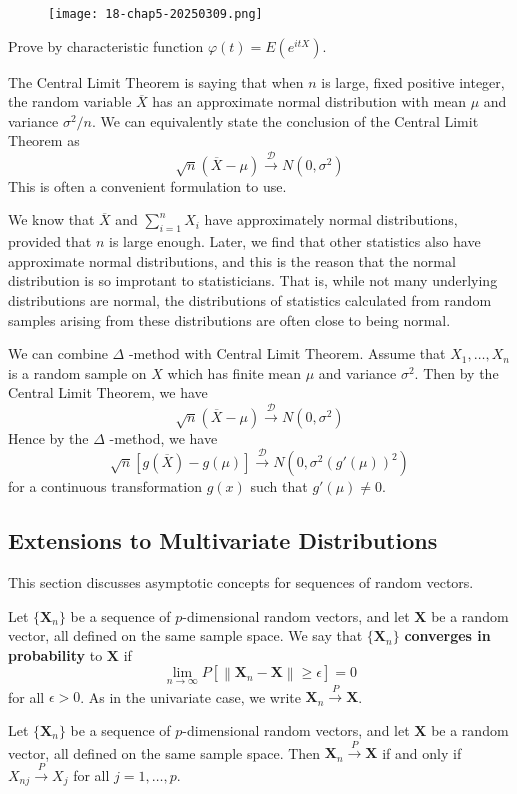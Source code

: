 \begin{figure}[H]
\centering
\texttt{[image: 18-chap5-20250309.png]}
\label{}
\end{figure}

Prove by characteristic function $\varphi(t)=E(e^{ itX })$.

The Central Limit Theorem is saying that when $n$ is large, fixed positive integer, the random variable $\overline{X}$ has an approximate normal distribution with mean $\mu$ and variance $\sigma^{2}/n$. We can equivalently state the conclusion of the Central Limit Theorem as
\[
\sqrt{ n }(\overline{X}-\mu)\overset{ \mathcal{D} }{ \to }N(0,\sigma^{2})
\]
This is often a convenient formulation to use.

\begin{remark}
We know that $\overline{X}$ and $\sum_{i=1}^{n}X_i$ have approximately normal distributions, provided that $n$ is large enough. Later, we find that other statistics also have approximate normal distributions, and this is the reason that the normal distribution is so improtant to statisticians. That is, while not many underlying distributions are normal, the distributions of statistics calculated from random samples arising from these distributions are often close to being normal.
\end{remark}
We can combine $\Delta$ -method with Central Limit Theorem. Assume that $X_1,\dots,X_n$ is a random sample on $X$ which has finite mean $\mu$ and variance $\sigma^{2}$. Then by the Central Limit Theorem, we have
\[
\sqrt{ n }(\overline{X}-\mu)\overset{ \mathcal{D} }{ \to }N(0,\sigma^{2})
\]
Hence by the $\Delta$ -method, we have
\[
\sqrt{ n }[g(\overline{X})-g(\mu)]\overset{ \mathcal{D} }{ \to }N(0,\sigma^{2}(g'(\mu))^{2})
\]
for a continuous transformation $g(x)$ such that $g'(\mu)\neq0$.

\subsection{Extensions to Multivariate Distributions}

This section discusses asymptotic concepts for sequences of random vectors.

\begin{definition}
Let $\{\mathbf{X}_n\}$ be a sequence of $p$-dimensional random vectors, and let $\mathbf{X}$ be a random vector, all defined on the same sample space. We say that $\{\mathbf{X}_n\}$ \textbf{converges in probability} to $\mathbf{X}$ if
\[
\lim_{n \rightarrow \infty} P\left[\left\|\mathbf{X}_n-\mathbf{X}\right\| \geq \epsilon\right]=0
\]for all $\epsilon>0$. As in the univariate case, we write $\mathbf{X}_n \xrightarrow{P} \mathbf{X}$.
\end{definition}
\begin{theorem}[Theorem 5.4.1]
Let $\{\mathbf{X}_n\}$ be a sequence of $p$-dimensional random vectors, and let $\mathbf{X}$ be a random vector, all defined on the same sample space. Then $\mathbf{X}_n \xrightarrow{P} \mathbf{X}$ if and only if $X_{n j} \xrightarrow{P} X_j$ for all $j=1, \ldots, p$.\label{479de5}
\end{theorem}

